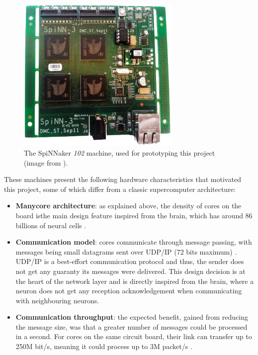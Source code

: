 \begin{figure}[!ht]
   \centering
       \includegraphics[width=0.7\textwidth]{figures/spin3.png}
       \caption{The SpiNNaker \textit{102} machine, used for prototyping this project (image from \cite{spinn-3}).}
       \label{fig:spinn3}
\end{figure}

These machines present the following hardware characteristics that motivated this project, some of which differ from a classic supercomputer architecture:

\begin{itemize}
\item \textbf{Manycore architecture}: as explained above, the density of cores on the board isthe main design feature inspired from the brain, which has around 86 billions of neural cells \cite{5th-summit}.
\item \textbf{Communication model}: cores communicate through message passing, with messages being small datagrams sent over UDP/IP (72 bits maximum) \cite{ws6}. UDP/IP is a best-effort communication protocol and thus, the sender does not get any guaranty its messages were delivered. This design decision is at the heart of the network layer and is directly inspired from the brain, where a neuron does not get any reception acknowledgement when communicating with neighbouring neurons.
\item \textbf{Communication throughput}: the expected benefit, gained from reducing the message size, was that a greater number of messages could be processed in a second. For cores on the same circuit board, their link can transfer up to 250M bit/s, meaning it could process up to 3M packet/s \cite{ws6}.
\end{itemize}

